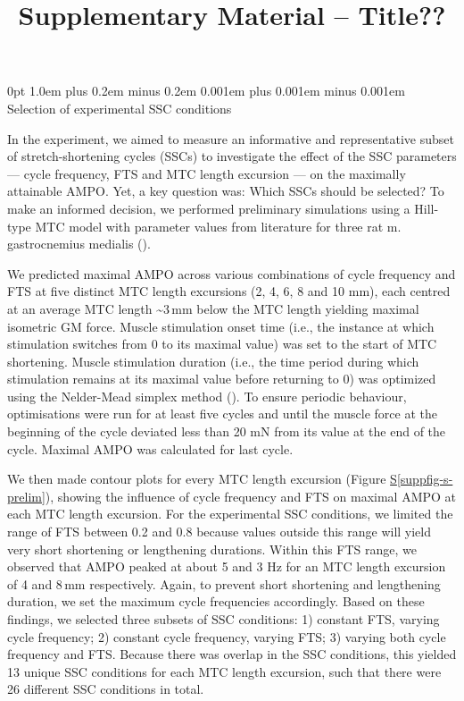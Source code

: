 \documentclass[
  11pt,
  a4paper]{article}
\title{Supplementary Material -- Title??}
\author{}
\date{}
\makeatletter
\renewcommand{\section}{%
  \@startsection{section}{1}
    {0pt} 					%
    {1.0em plus 0.2em minus 0.2em} 	%
    {0.001em plus 0.001em minus 0.001em}    	%
    {\Large\bfseries\sffamily}%
}
\newcommand*\quartosuppfigref[1]{Figure \hyperref[#1]{S\ref{#1}}}
\makeatother
\begin{document}
\linenumbers

\renewcommand{\thesection}{S\arabic{section}}
\setcounter{section}{0}


\section{Selection of experimental SSC
conditions}\label{selection-of-experimental-ssc-conditions}

In the experiment, we aimed to measure an informative and representative
subset of stretch-shortening cycles (SSCs) to investigate the effect of
the SSC parameters --- cycle frequency, FTS and MTC length excursion ---
on the maximally attainable AMPO. Yet, a key question was: Which SSCs
should be selected? To make an informed decision, we performed
preliminary simulations using a Hill-type MTC model with parameter
values from literature for three rat m. gastrocnemius medialis
().

We predicted maximal AMPO across various combinations of cycle frequency
and FTS at five distinct MTC length excursions (2, 4, 6, 8 and 10 mm),
each centred at an average MTC length \textasciitilde3\,mm below the MTC
length yielding maximal isometric GM force. Muscle stimulation onset
time (i.e., the instance at which stimulation switches from 0 to its
maximal value) was set to the start of MTC shortening. Muscle
stimulation duration (i.e., the time period during which stimulation
remains at its maximal value before returning to 0) was optimized using
the Nelder-Mead simplex method (). To ensure periodic behaviour, optimisations were run
for at least five cycles and until the muscle force at the beginning of
the cycle deviated less than 20 mN from its value at the end of the
cycle. Maximal AMPO was calculated for last cycle.

We then made contour plots for every MTC length excursion
(\quartosuppfigref{suppfig-s-prelim}), showing the influence of cycle
frequency and FTS on maximal AMPO at each MTC length excursion. For the
experimental SSC conditions, we limited the range of FTS between 0.2 and
0.8 because values outside this range will yield very short shortening
or lengthening durations. Within this FTS range, we observed that AMPO
peaked at about 5 and 3 Hz for an MTC length excursion of 4 and 8\,mm
respectively. Again, to prevent short shortening and lengthening
duration, we set the maximum cycle frequencies accordingly. Based on
these findings, we selected three subsets of SSC conditions: 1) constant
FTS, varying cycle frequency; 2) constant cycle frequency, varying FTS;
3) varying both cycle frequency and FTS. Because there was overlap in
the SSC conditions, this yielded 13 unique SSC conditions for each MTC
length excursion, such that there were 26 different SSC conditions in
total.
\end{document}
